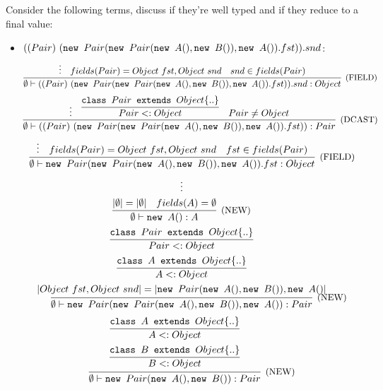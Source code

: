 \subsection{}

Consider the following terms, discuss if they're well typed and if they reduce to a final value:
\begin{itemize}
\item $((Pair)\ (\texttt{new } Pair(\texttt{new } Pair(\texttt{new } A(), \texttt{new } B()), \texttt{new } A()).fst)).snd$:
  \[
  \infer[\text{\small{(FIELD)}}]
	{ \emptyset \vdash ((Pair)\ (\NEW Pair(\NEW Pair(\NEW A(), \NEW B()), \NEW A()).fst)).snd: Object }
	{
	  \vdots &
	  fields(Pair) = Object\ fst, Object\ snd &
	  snd \in fields(Pair)
	}
	\]
	\[
	\infer[\text{\small{(DCAST)}}]
	      { \emptyset \vdash ((Pair)\ (\NEW Pair(\NEW Pair(\NEW A(), \NEW B()), \NEW A()).fst)): Pair }
	      {
		\vdots &
		\infer{ Pair <: Object }{ \texttt{class }Pair\texttt{ extends }Object\{..\} } &
		Pair \ne Object
	      }
	      \]
	      \[
	      \infer[\text{\small{(FIELD)}}]
		    { \emptyset \vdash \NEW Pair(\NEW Pair(\NEW A(), \NEW B()), \NEW A()).fst: Object }
		    {
		      \vdots &
		      fields(Pair) = Object\ fst, Object\ snd &
		      fst \in fields(Pair)
		    }
	            \]
	            \[
		    \infer[\text{\small{(NEW)}}]
		          { \emptyset \vdash \NEW Pair(\NEW Pair(\NEW A(), \NEW B()), \NEW A()): Pair }
		          {
			    \begin{gathered}
			      \vdots \\
			      \infer[\text{\small{(NEW)}}]
				    { \emptyset \vdash \NEW A(): A }
				    {
				      |\emptyset| = |\emptyset| &
				      fields(A) = \emptyset
				    } \\
				    \infer{ Pair <: Object }{ \texttt{class }Pair\texttt{ extends }Object\{..\} } \\
				    \infer{ A <: Object }{ \texttt{class }A\texttt{ extends }Object\{..\} } \\
				    |Object\ fst, Object\ snd| = |\NEW Pair(\NEW A(), \NEW B()), \NEW A()|
			    \end{gathered}
		          }
	                  \]
	                  \[
		          \infer[\text{\small{(NEW)}}]
		                { \emptyset \vdash \NEW Pair(\NEW A(), \NEW B()): Pair }
		                {
			          \begin{gathered}
				    \infer{ A <: Object }{ \texttt{class }A\texttt{ extends }Object\{..\} } \\
				    \infer{ B <: Object }{ \texttt{class }B\texttt{ extends }Object\{..\} } \\

\end{gathered}}\]
\end{itemize}
